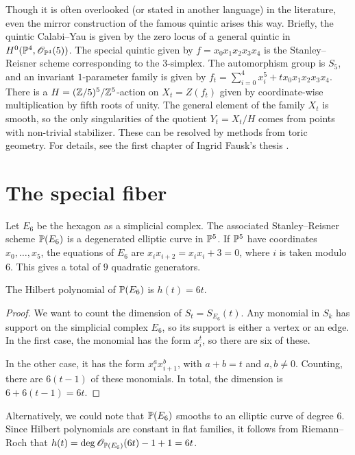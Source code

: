Though it is often overlooked (or stated in another language) in the literature, even the mirror construction of the famous quintic arises this way. Briefly, the quintic Calabi--Yau is given by the zero locus of a general quintic in $H^0(\P^4,\OO_{\P^4}(5))$. The special quintic given by $f=x_0x_1x_2x_3x_4$ is the Stanley--Reisner scheme corresponding to the 3-simplex. The automorphism group is $S_5$, and an invariant $1$-parameter family is given by $f_t=\sum_{i=0}^4 x_i^5 + t x_0 x_1x_2x_3x_4$. There is a $H=(\Z/5)^5/\Z^5$-action on $X_t = Z(f_t)$ given by coordinate-wise multiplication by fifth roots of unity. The general element of the family $X_t$ is smooth, so the only singularities of the quotient $Y_t=X_t/H$ comes from points with non-trivial stabilizer. These can be resolved by methods from toric geometry. For details, see the first chapter of Ingrid Fausk's thesis \cite{fausk_thesis}.


\section{The special fiber}

Let $E_6$ be the hexagon as a simplicial complex. The associated Stanley--Reisner scheme $\P(E_6)$ is a degenerated elliptic curve in $\P^5$. If $\P^5$ have coordinates $x_0,\ldots,x_5$, the equations of $E_6$ are $x_ix_{i+2}=x_ix_i+3=0$, where $i$ is taken modulo $6$. This gives a total of $9$ quadratic generators.

\begin{lemma}
The Hilbert polynomial of $\P(E_6)$ is $h(t)=6t$.
\end{lemma}
\begin{proof}
We want to count the dimension of $S_t=S_{E_6}(t)$. Any monomial in $S_k$ has support on the simplicial complex $E_6$, so its support is either a vertex or an edge. In the first case, the monomial has the form $x_i^t$, so there are six of these.

In the other case, it has the form $x_i^ax_{i+1}^b$, with $a+b=t$ and $a,b \neq 0$. Counting, there are $6(t-1)$ of these monomials. In total, the dimension is $6+6(t-1)=6t$.
\end{proof}
\begin{remark}
Alternatively, we could note that $\P(E_6)$ smooths to an elliptic curve of degree $6$. Since Hilbert polynomials are constant in flat families, it follows from Riemann--Roch that $h(t)=\deg \OO_{\P(E_6)}(6t)-1+1=6t$.
\end{remark}

